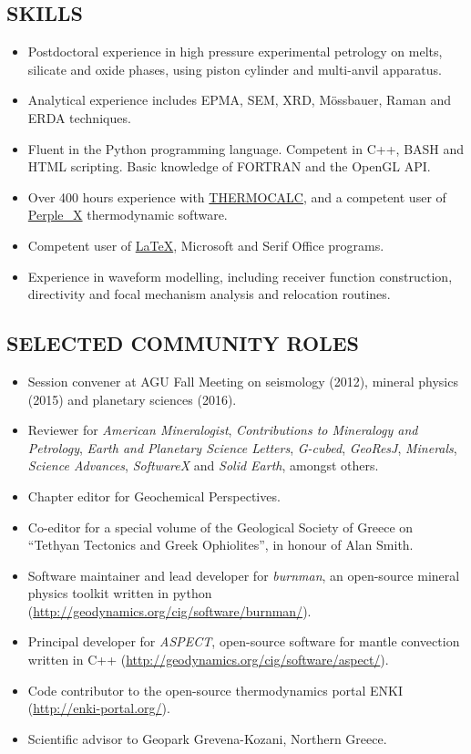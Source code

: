 \documentclass[11pt,twoside,a4paper]{article}
\begin{document}
\subsection*{SKILLS}
\begin{itemize}
\item Postdoctoral experience in high pressure experimental petrology on melts, silicate and oxide phases, using piston cylinder and multi-anvil apparatus.
\item Analytical experience includes EPMA, SEM, XRD, M\"ossbauer, Raman and ERDA techniques.
\item Fluent in the Python programming language. Competent in C++, BASH and HTML scripting. Basic knowledge of FORTRAN and the OpenGL API.
\item Over 400 hours experience with \href{http:www.metamorph.geo.unimainz.de/thermocalc/}{THERMOCALC}, and a competent user of \href{http:www.perplex.ethz.ch/}{Perple\_X} thermodynamic software.
\item Competent user of \href{http://www.latex-project.org/}{\LaTeX}, Microsoft and Serif Office programs.
\item Experience in waveform modelling, including receiver function construction, directivity and focal mechanism analysis and relocation routines.
\end{itemize}

\subsection*{SELECTED COMMUNITY ROLES}
\begin{itemize}
\item Session convener at AGU Fall Meeting on seismology (2012), mineral physics (2015) and planetary sciences (2016).
\item Reviewer for \emph{American Mineralogist}, \emph{Contributions to Mineralogy and Petrology}, \emph{Earth and Planetary Science Letters}, \emph{G-cubed}, \emph{GeoResJ}, \emph{Minerals}, \emph{Science Advances}, \emph{SoftwareX} and \emph{Solid Earth}, amongst others. %
\item Chapter editor for Geochemical Perspectives.
\item Co-editor for a special volume of the Geological Society of Greece on ``Tethyan Tectonics and Greek Ophiolites'', in honour of Alan Smith.
\item Software maintainer and lead developer for \emph{burnman}, an open-source mineral physics toolkit written in python (\url{http://geodynamics.org/cig/software/burnman/}).
\item Principal developer for \emph{ASPECT}, open-source software for mantle convection written in C++ (\url{http://geodynamics.org/cig/software/aspect/}).
\item Code contributor to the open-source thermodynamics portal ENKI \\(\url{http://enki-portal.org/}).
\item Scientific advisor to Geopark Grevena-Kozani, Northern Greece.
\end{itemize}
\end{document}
